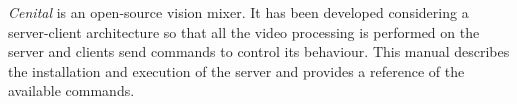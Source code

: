 \documentclass[../main.tex]{subfiles}
\begin{document}
\textit{Cenital} is an open-source vision mixer. It has been developed considering a server-client architecture so that all the video processing is performed on the server and clients send commands to control its behaviour. This manual describes the installation and execution of the server and provides a reference of the available commands.\newline
\end{document}
